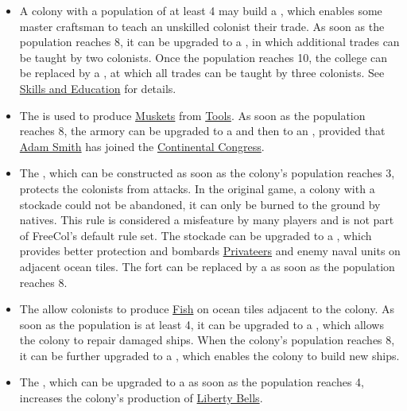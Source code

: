 \documentclass[12pt]{book}
\begin{document}
\begin{itemize}
\item A colony with a population of at least 4 may build a
  , which enables some master craftsman to teach
  an unskilled colonist their trade. As soon as the population reaches
  8, it can be upgraded to a , in which additional
  trades can be taught by two colonists. Once the population reaches
  10, the college can be replaced by a , at which
  all trades can be taught by three colonists. See \hyperlink{Skills
  and Education}{Skills and Education} for details.

\item The  is used to produce
  \hyperlink{Muskets}{Muskets} from \hyperlink{Tools}{Tools}. As soon
  as the population reaches 8, the armory can be upgraded to a
   and then to an , provided that
  \hyperlink{Adam Smith}{Adam Smith} has joined the
  \hyperlink{Continental Congress}{Continental Congress}.

\item The , which can be constructed as soon as the
  colony's population reaches 3, protects the colonists from
  attacks. In the original game, a colony with a stockade could not be
  abandoned, it can only be burned to the ground by natives. This rule
  is considered a misfeature by many players and is not part of
  FreeCol's default rule set. The stockade can be upgraded to a
  , which provides better protection and bombards
  \hyperlink{Privateer}{Privateers} and enemy naval units on adjacent
  ocean tiles. The fort can be replaced by a  as
  soon as the population reaches 8.

\item The  allow colonists to produce
  \hyperlink{Fish}{Fish} on ocean tiles adjacent to the colony. As
  soon as the population is at least 4, it can be upgraded to a
  , which allows the colony to repair damaged
  ships. When the colony's population reaches 8, it can be further
  upgraded to a , which enables the colony to build
  new ships.

\item The , which can be upgraded to a
   as soon as the population reaches 4, increases
  the colony's production of \hyperlink{Liberty Bells}{Liberty Bells}.


\end{itemize}
\end{document}
